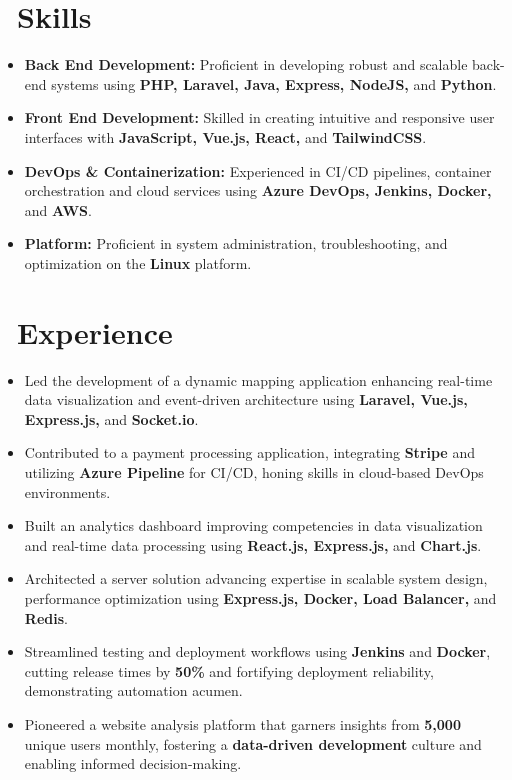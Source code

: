 \documentclass{resume}
\begin{document}



\section{\faCogs\ Skills}
\begin{itemize}[parsep=0.5ex]
  \item \textbf{Back End Development:} Proficient in developing robust and scalable back-end systems using \textbf{PHP, Laravel, Java, Express, NodeJS,} and \textbf{Python}.
  \item \textbf{Front End Development:} Skilled in creating intuitive and responsive user interfaces with \textbf{JavaScript, Vue.js, React,} and \textbf{TailwindCSS}.
  \item \textbf{DevOps \& Containerization:} Experienced in CI/CD pipelines, container orchestration and cloud services using \textbf{Azure DevOps, Jenkins, Docker,} and \textbf{AWS}.
  \item \textbf{Platform:} Proficient in system administration, troubleshooting, and optimization on the \textbf{Linux} platform.
\end{itemize}

\section{\faUsers\ Experience}
\role{Software Developer}{Full-time}
\begin{itemize}
 \item Led the development of a dynamic mapping application enhancing real-time data visualization and event-driven architecture using \textbf{Laravel, Vue.js, Express.js,} and \textbf{Socket.io}.
 \item Contributed to a payment processing application, integrating \textbf{Stripe} and utilizing \textbf{Azure Pipeline} for CI/CD, honing skills in cloud-based DevOps environments.
 \item Built an analytics dashboard improving competencies in data visualization and real-time data processing using \textbf{React.js, Express.js,} and \textbf{Chart.js}.
 \item Architected a server solution advancing expertise in scalable system design, performance optimization using \textbf{Express.js, Docker, Load Balancer,} and \textbf{Redis}.
 \item Streamlined testing and deployment workflows using \textbf{Jenkins} and \textbf{Docker}, cutting release times by \textbf{50\%} and fortifying deployment reliability, demonstrating automation acumen.
 \item Pioneered a website analysis platform that garners insights from \textbf{5,000} unique users monthly, fostering a \textbf{data-driven development} culture and enabling informed decision-making.
\end{itemize}
\end{document}
